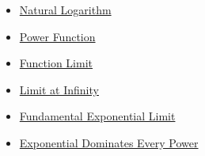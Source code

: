 \begin{dependencies}
\begin{itemize}
  \item \hyperref[def:natural-logarithm]{Natural Logarithm}
  \item \hyperref[def:power-function]{Power Function}
  \item \hyperref[def:limit-function]{Function Limit}
  \item \hyperref[def:limit-at-infinity]{Limit at Infinity}
  \item \hyperref[prop:limit-exponential-fundamental]{Fundamental Exponential Limit}
  \item \hyperref[prop:exponential-dominates-power]{Exponential Dominates Every Power}
\end{itemize}
\end{dependencies}
